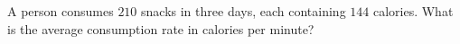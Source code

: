 A person consumes $210$ snacks in three days, each containing $144$ calories. What is the average consumption rate in calories per minute?
